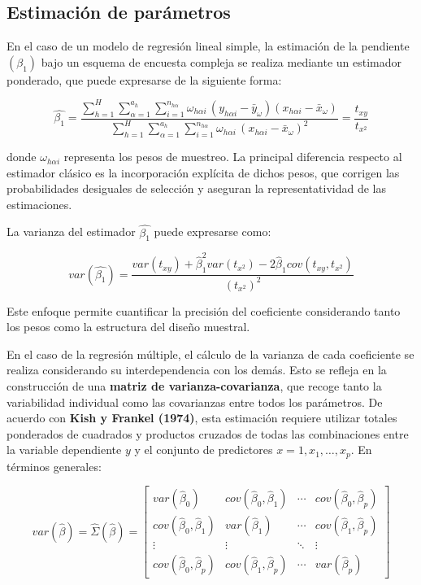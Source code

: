 \documentclass[
  12pt,
]{book}
\begin{document}
\subsection{Estimación de parámetros}\label{estimaciuxf3n-de-paruxe1metros}

En el caso de un modelo de regresión lineal simple, la estimación de la pendiente \((\beta_1)\) bajo un esquema de encuesta compleja se realiza mediante un estimador ponderado, que puede expresarse de la siguiente forma:

\[
\hat{\beta_{1}}  =  
\frac{\sum_{h=1}^H \sum_{\alpha=1}^{a_h} \sum_{i=1}^{n_{h\alpha}} \omega_{h\alpha i}\,(y_{h\alpha i}-\bar{y}_{\omega})(x_{h\alpha i}-\bar{x}_{\omega})}
{\sum_{h=1}^H \sum_{\alpha=1}^{a_h} \sum_{i=1}^{n_{h\alpha}} \omega_{h\alpha i}\,(x_{h\alpha i}-\bar{x}_{\omega})^{2}}
= \frac{t_{xy}}{t_{x^{2}}}
\]

donde \(\omega_{h\alpha i}\) representa los pesos de muestreo. La principal diferencia respecto al estimador clásico es la incorporación explícita de dichos pesos, que corrigen las probabilidades desiguales de selección y aseguran la representatividad de las estimaciones.

La varianza del estimador \(\hat{\beta_1}\) puede expresarse como:

\[
var\left(\hat{\beta_{1}}\right)  
=  \frac{var(t_{xy})+\hat{\beta}_{1}^{2}var(t_{x^{2}})-2\hat{\beta}_{1}cov(t_{xy},t_{x^{2}})}{(t_{x^{2}})^{2}}
\]

Este enfoque permite cuantificar la precisión del coeficiente considerando tanto los pesos como la estructura del diseño muestral.

En el caso de la regresión múltiple, el cálculo de la varianza de cada coeficiente se realiza considerando su interdependencia con los demás. Esto se refleja en la construcción de una \textbf{matriz de varianza-covarianza}, que recoge tanto la variabilidad individual como las covarianzas entre todos los parámetros. De acuerdo con \textbf{Kish y Frankel (1974)}, esta estimación requiere utilizar totales ponderados de cuadrados y productos cruzados de todas las combinaciones entre la variable dependiente \(y\) y el conjunto de predictores \(x = {1, x_1, …, x_p}\). En términos generales:

\[
var(\hat{\beta}) = \hat{\Sigma}(\hat{\beta}) =
\begin{bmatrix}
var(\hat{\beta}_{0}) & cov(\hat{\beta}_{0},\hat{\beta}_{1}) & \cdots & cov(\hat{\beta}_{0},\hat{\beta}_{p}) \\
cov(\hat{\beta}_{0},\hat{\beta}_{1}) & var(\hat{\beta}_{1}) & \cdots & cov(\hat{\beta}_{1},\hat{\beta}_{p}) \\
\vdots & \vdots & \ddots & \vdots \\
cov(\hat{\beta}_{0},\hat{\beta}_{p}) & cov(\hat{\beta}_{1},\hat{\beta}_{p}) & \cdots & var(\hat{\beta}_{p})
\end{bmatrix}
\]
\end{document}

